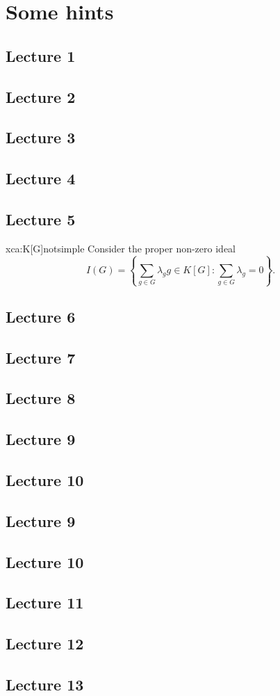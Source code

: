 \chapter[Some hints]{Some hints}

\section*{Lecture 1}
\section*{Lecture 2}
\section*{Lecture 3}
\section*{Lecture 4}
\section*{Lecture 5}

\begin{sol}{xca:K[G]notsimple}
Consider the proper non-zero ideal 
\[
	I(G)=\left\{\sum_{g\in G}\lambda_gg\in K[G]:\sum_{g\in G}\lambda_g=0\right\}.
\]
\end{sol}
\section*{Lecture 6}
\section*{Lecture 7}
\section*{Lecture 8}
\section*{Lecture 9}
\section*{Lecture 10}
\section*{Lecture 9}
\section*{Lecture 10}
\section*{Lecture 11}
\section*{Lecture 12}
\section*{Lecture 13}
